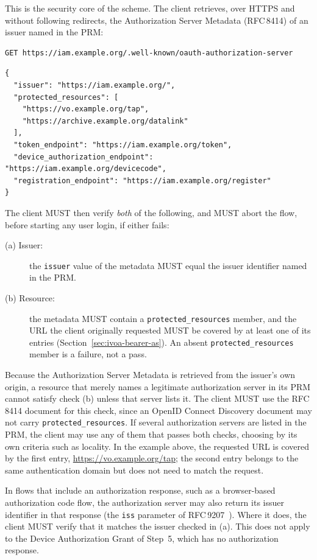 \documentclass[11pt,a4paper]{ivoa}
\newcommand{\rfc}[1]{RFC\,#1}
\begin{document}
This is the security core of the scheme. The client retrieves, over HTTPS
and without following redirects, the Authorization Server Metadata
(\rfc{8414}) of an issuer named in the PRM:

\begin{verbatim}
GET https://iam.example.org/.well-known/oauth-authorization-server
\end{verbatim}

\begin{verbatim}
{
  "issuer": "https://iam.example.org/",
  "protected_resources": [
    "https://vo.example.org/tap",
    "https://archive.example.org/datalink"
  ],
  "token_endpoint": "https://iam.example.org/token",
  "device_authorization_endpoint": "https://iam.example.org/devicecode",
  "registration_endpoint": "https://iam.example.org/register"
}
\end{verbatim}

The client MUST then verify \emph{both} of the following, and MUST abort the
flow, before starting any user login, if either fails:

\begin{description}
\item[(a) Issuer:] the \verb|issuer| value of the metadata MUST equal the
      issuer identifier named in the PRM.
\item[(b) Resource:] the metadata MUST contain a \verb|protected_resources|
      member, and the URL the client originally requested MUST be covered by
      at least one of its entries (Section~\ref{sec:ivoa-bearer-as}).
      An absent \verb|protected_resources| member is a failure, not a pass.
\end{description}

Because the Authorization Server Metadata is retrieved from the issuer's own
origin, a resource that merely names a legitimate authorization server in its
PRM cannot satisfy check (b) unless that server lists it. The client MUST use
the \rfc{8414} document for this check, since an OpenID Connect Discovery
document may not carry \verb|protected_resources|. If several authorization
servers are listed in the PRM, the client may use any of them that passes both
checks, choosing by its own criteria such as locality. In the example above, the requested URL is covered by the first
entry, \url{https://vo.example.org/tap}; the second entry belongs to the same
authentication domain but does not need to match the request.

In flows that include an authorization response, such as a browser-based
authorization code flow, the authorization server may also return its issuer
identifier in that response (the {\tt iss} parameter of \rfc{9207}~\citep{std:RFC9207}). Where it
does, the client MUST verify that it matches the issuer checked in (a). This
does not apply to the Device Authorization Grant of Step~5, which has no
authorization response.
\end{document}
